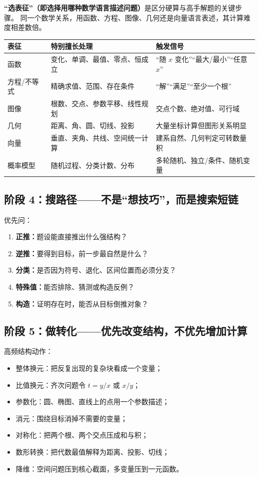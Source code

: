 \documentclass[11pt,a4paper]{ctexart}
\begin{document}
\textbf{“选表征”（即选择用哪种数学语言描述问题）}是区分硬算与高手解题的关键步骤。
同一个数学关系，用函数、方程、图像、几何还是向量语言表述，其计算难度相差数倍。

\begin{longtable}{p{3cm}p{5.4cm}p{6.6cm}}
\toprule
\textbf{表征} & \textbf{特别擅长处理} & \textbf{触发信号}\\
\midrule
函数 & 变化、单调、最值、零点、恒成立 & “随 $x$ 变化”“最大/最小”“任意 $x$”\\ \hline
方程/不等式 & 精确求值、范围、存在条件 & “解”“满足”“至少一个根”\\ \hline
图像 & 根数、交点、参数平移、线性规划 & 交点个数、绝对值、可行域\\ \hline
几何 & 距离、角、圆、切线、投影 & 大量坐标计算但图形关系明显\\ \hline
向量 & 垂直、夹角、共线、空间统一计算 & 建系自然、几何判定可转数量积\\ \hline
概率模型 & 随机过程、分类计数、分布 & 多轮随机、独立/条件、随机变量\\
\bottomrule
\end{longtable}

\subsection{阶段 4：搜路径——不是“想技巧”，而是搜索短链}

优先问：
\begin{enumerate}
  \item \textbf{正推：}题设能直接推出什么强结构？
  \item \textbf{逆推：}要得到目标，前一步最自然是什么？
  \item \textbf{分类：}是否因为符号、退化、区间位置而必须分支？
  \item \textbf{特殊值：}能否排除、猜测或构造反例？
  \item \textbf{构造：}证明存在时，能否从目标倒推对象？
\end{enumerate}

\subsection{阶段 5：做转化——优先改变结构，不优先增加计算}

高频结构动作：
\begin{itemize}
  \item 整体换元：把反复出现的复杂块看成一个变量；
  \item 比值换元：齐次问题令 $t=y/x$ 或 $x/y$；
  \item 参数化：圆、椭图、直线上的点用一个参数描述；
  \item 消元：围绕目标消掉不需要的变量；
  \item 对称化：把两个根、两个交点压成和与积；
  \item 数形转换：把代数最值解释为距离、投影、切线；
  \item 降维：空间问题压到核心截面，多变量压到一元函数。
\end{itemize}
\end{document}
